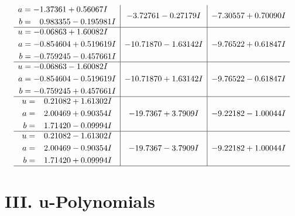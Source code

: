 \documentclass[1p]{elsarticle_modified}
\theoremstyle{definition}
\begin{document}
$$\begin{array}{c|c|c}
\begin{aligned}
a &= -1.37361 + 0.56067 I \\
b &= \phantom{-}0.983355 - 0.195981 I\end{aligned}
 & -3.72761 - 0.27179 I & -7.30557 + 0.70090 I \\ \hline\begin{aligned}
u &= -0.06863 + 1.60082 I \\
a &= -0.854604 + 0.519619 I \\
b &= -0.759245 - 0.457661 I\end{aligned}
 & -10.71870 - 1.63142 I & -9.76522 + 0.61847 I \\ \hline\begin{aligned}
u &= -0.06863 - 1.60082 I \\
a &= -0.854604 - 0.519619 I \\
b &= -0.759245 + 0.457661 I\end{aligned}
 & -10.71870 + 1.63142 I & -9.76522 - 0.61847 I \\ \hline\begin{aligned}
u &= \phantom{-}0.21082 + 1.61302 I \\
a &= \phantom{-}2.00469 + 0.90354 I \\
b &= \phantom{-}1.71420 - 0.09994 I\end{aligned}
 & -19.7367 + 3.7909 I & -9.22182 - 1.00044 I \\ \hline\begin{aligned}
u &= \phantom{-}0.21082 - 1.61302 I \\
a &= \phantom{-}2.00469 - 0.90354 I \\
b &= \phantom{-}1.71420 + 0.09994 I\end{aligned}
 & -19.7367 - 3.7909 I & -9.22182 + 1.00044 I\\
 \hline 
 \end{array}$$\newpage
\newpage\renewcommand{\arraystretch}{1}
\centering \section*{ III. u-Polynomials}
\end{document}
